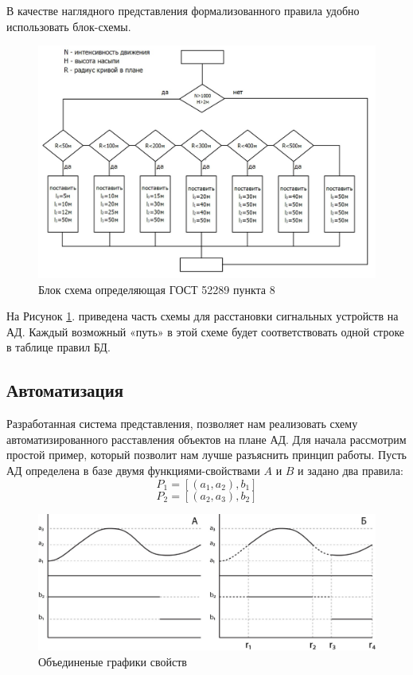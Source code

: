 В качестве наглядного представления формализованного правила удобно использовать блок-схемы. 

\begin{figure}[h]
	\centering
	\includegraphics[scale=1]{images/auto_scheme_2}
	\caption{Блок схема определяющая ГОСТ 52289 пункта 8}
	\label{auto_scheme_2}
\end{figure}

На Рисунок \ref{auto_scheme_2}. приведена часть схемы для расстановки сигнальных устройств на АД. Каждый возможный «путь» в этой схеме будет соответствовать одной строке в таблице правил БД. 

\subsection{Автоматизация}
Разработанная система представления, позволяет нам реализовать схему автоматизированного расставления объектов на плане АД. Для начала рассмотрим простой пример, который позволит нам лучше разъяснить принцип работы. Пусть АД определена в базе двумя функциями-свойствами $A$ и $B$ и задано два правила:
$$
P_1 = [(a_1, a_2), b_1]
$$
$$
P_2 = [(a_2, a_3), b_2]
$$
\begin{figure}[h]
	\centering
	\includegraphics[scale=1]{images/auto_grap3}
	\caption{Объединеные графики свойств}
	\label{auto_graph3}
\end{figure}

